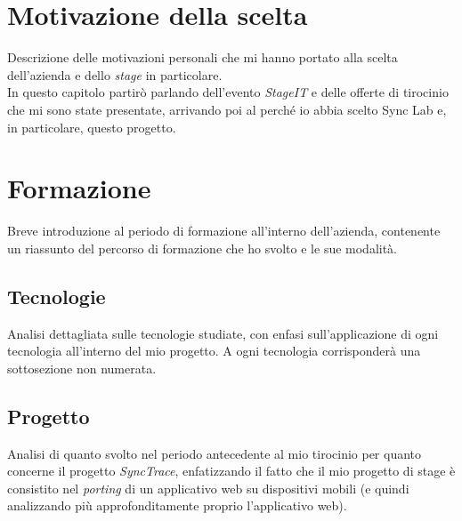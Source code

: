 
\section{Motivazione della scelta}

Descrizione delle motivazioni personali che mi hanno portato alla scelta dell'azienda e dello \textit{stage} in particolare. \\
In questo capitolo partirò parlando dell'evento \textit{StageIT} e delle offerte di tirocinio che mi sono state presentate, arrivando poi al perché io abbia scelto Sync Lab e, in particolare, questo progetto.


\section{Formazione}

Breve introduzione al periodo di formazione all'interno dell'azienda, contenente un riassunto del percorso di formazione che ho svolto e le sue modalità.

\subsection{Tecnologie}

Analisi dettagliata sulle tecnologie studiate, con enfasi sull'applicazione di ogni tecnologia all'interno del mio progetto. A ogni tecnologia corrisponderà una sottosezione non numerata.

\subsection{Progetto}

Analisi di quanto svolto nel periodo antecedente al mio tirocinio per quanto concerne il progetto \textit{SyncTrace}, enfatizzando il fatto che il mio progetto di stage è consistito nel \textit{porting} di un applicativo web su dispositivi mobili (e quindi analizzando più approfonditamente proprio l'applicativo web).

